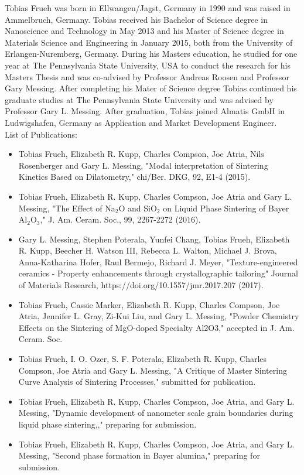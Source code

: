 Tobias Frueh was born in Ellwangen/Jagst, Germany in 1990 and was raised in Ammelbruch, Germany. Tobias received his Bachelor of Science degree in Nanoscience and Technology in May 2013 and his Master of Science degree in Materials Science and Engineering in January 2015, both from the University of Erlangen-Nuremberg, Germany. During his Masters education, he studied for one year at The Pennsylvania State University, USA to conduct the research for his Masters Thesis and was co-advised by Professor Andreas Roosen and Professor Gary Messing. After completing his Mater of Science degree Tobias continued his graduate studies at The Pennsylvania State University and was advised by Professor Gary L. Messing. After graduation, Tobias joined Almatis GmbH in Ludwigshafen, Germany as Application and Market Development Engineer.
\\
\newline
\noindent List of Publications:
\begin{itemize}
	\item Tobias Frueh, Elizabeth R. Kupp, Charles Compson, Joe Atria, Nils Rosenberger and Gary L. Messing, "Modal interpretation of Sintering Kinetics Based on Dilatometry," chi/Ber. DKG, 92, E1-4 (2015). 
	\item Tobias Frueh, Elizabeth R. Kupp, Charles Compson, Joe Atria and Gary L. Messing, "The Effect of Na$_{2}$O and SiO$_{2}$ on Liquid Phase Sintering of Bayer Al$_{2}$O$_{3}$," J. Am. Ceram. Soc., 99, 2267-2272 (2016).
	\item Gary L. Messing, Stephen Poterala, Yunfei Chang, Tobias Frueh, Elizabeth R. Kupp, Beecher H. Watson III, Rebecca L. Walton, Michael J. Brova, Anna-Katharina Hofer, Raul Bermejo, Richard J. Meyer, "Texture-engineered ceramics - Property enhancements through crystallographic tailoring" Journal of Materials Research, https://doi.org/10.1557/jmr.2017.207 (2017).
	\item Tobias Frueh, Cassie Marker, Elizabeth R. Kupp, Charles Compson, Joe Atria, Jennifer L. Gray, Zi-Kui Liu, and Gary L. Messing, "Powder Chemistry Effects on the Sintering of MgO-doped Specialty Al2O3," accepted in J. Am. Ceram. Soc.
	\item Tobias Frueh, I. O. Ozer, S. F. Poterala, Elizabeth R. Kupp, Charles Compson, Joe Atria and Gary L. Messing, "A Critique of Master Sintering Curve Analysis of Sintering Processes," submitted for publication.
	\item Tobias Frueh, Elizabeth R. Kupp, Charles Compson, Joe Atria, and Gary L. Messing, "Dynamic development of nanometer scale grain boundaries during liquid phase sintering,," preparing for submission.
	\item Tobias Frueh, Elizabeth R. Kupp, Charles Compson, Joe Atria, and Gary L. Messing, "Second phase formation in Bayer alumina," preparing for submission.
\end{itemize}